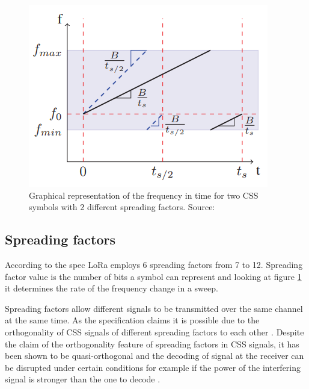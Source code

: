 

\begin{figure}[h!]
  \centering
  \includegraphics[scale=0.5]{figures/slope.PNG}
  \caption{Graphical representation of the frequency in time for
two CSS symbols with 2 different spreading factors. Source: \cite{slope_diagram}}
  \label{fig:slope}
\end{figure}


\subsection{Spreading factors}

According to the spec \cite{semtech_spec}
LoRa employs 6 spreading factors from 7 to 12. Spreading factor value is the number of bits a symbol can represent \cite{sf_article} and looking at figure \ref{fig:slope} it determines the rate of the frequency change in a sweep. 

Spreading factors allow different signals to be transmitted
over the same channel at the same time. As the specification claims it is possible due to the orthogonality of CSS signals of different spreading factors to each other \cite{semtech_spec}.
Despite the claim of the orthogonality feature of spreading factors in CSS signals, it has been shown to be quasi-orthogonal and the decoding of signal at the receiver
can be disrupted under certain conditions for example if the power of the interfering signal is stronger than the one to decode \cite{imperfect_1}.

